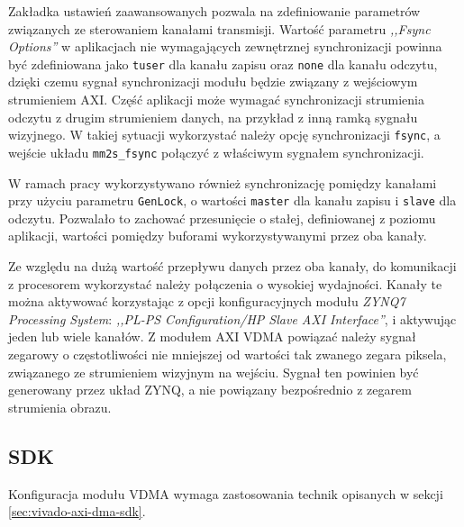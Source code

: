 Zakładka ustawień zaawansowanych pozwala na zdefiniowanie parametrów związanych ze sterowaniem kanałami transmisji.
Wartość parametru \textit{,,Fsync Options''} w aplikacjach nie wymagających zewnętrznej synchronizacji powinna być zdefiniowana jako \texttt{tuser} dla kanału zapisu oraz \texttt{none} dla kanału odczytu, dzięki czemu sygnał synchronizacji modułu będzie związany z wejściowym strumieniem AXI. %
Część aplikacji może wymagać synchronizacji strumienia odczytu z drugim strumieniem danych, na przykład z inną ramką sygnału wizyjnego. 
W takiej sytuacji wykorzystać należy opcję synchronizacji \texttt{fsync}, a wejście układu \texttt{mm2s\_fsync} połączyć z właściwym sygnałem synchronizacji.

W ramach pracy wykorzystywano również synchronizację pomiędzy kanałami przy użyciu parametru \texttt{GenLock}, o wartości \texttt{master} dla kanału zapisu i \texttt{slave} dla odczytu. 
Pozwalało to zachować przesunięcie o stałej, definiowanej z poziomu aplikacji, wartości pomiędzy buforami wykorzystywanymi przez oba kanały.

Ze względu na dużą wartość przepływu danych przez oba kanały, do komunikacji z procesorem wykorzystać należy połączenia o wysokiej wydajności. Kanały te można aktywować korzystając z opcji konfiguracyjnych modułu \emph{ZYNQ7 Processing System}: \emph{,,PL-PS Configuration/HP Slave AXI Interface''}, i aktywując jeden lub wiele kanałów. %
Z modułem AXI VDMA powiązać należy sygnał zegarowy o częstotliwości nie mniejszej od wartości tak zwanego zegara piksela, związanego ze strumieniem wizyjnym na wejściu. %
Sygnał ten powinien być generowany przez układ ZYNQ, a nie powiązany bezpośrednio z zegarem strumienia obrazu.

\subsection{SDK}
Konfiguracja modułu VDMA wymaga zastosowania technik opisanych w sekcji \ref{sec:vivado-axi-dma-sdk}. %

